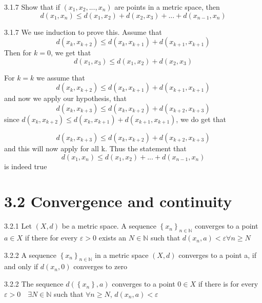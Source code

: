\documentclass[a4paper,norsk]{article}
\renewcommand{\geq}{\geqslant}
\renewcommand{\leq}{\leqslant}
\renewcommand{\epsilon}{\varepsilon}
\begin{document}
\begin{oppgavebox}{3.1.7}{}
Show that if $ \left( x_1, x_2, ..., x_n \right)  $ are points in a metric space, then 
\[
    d(x_1, x_n) \leq d(x_1, x_2) + d(x_2, x_3) + ... + d(x_{n-1} , x_n)
\]

\begin{proofbox}{3.1.7}{}
  We use induction to prove this. Assume that 
  \[
      d(x_k, x_{k+2}) \leq d(x_k, x_{k+1}) + d(x_{k+1}, x_{k+1})
  \]
  Then for $ k=0 $, we get that 
  \[
      d(x_1, x_3) \leq d(x_1, x_2) + d(x_2, x_3)
  \]
  
  For $ k=k $ we assume that 
  \[
      d(x_k, x_{k+2}) \leq d(x_k, x_{k+1}) + d(x_{k+1}, x_{k+1})
  \]
  and now we apply our hypothesis, that 
  \[
      d(x_k, x_{k+3}) \leq d(x_k, x_{k+2}) + d(x_{k+2}, x_{k+3})
  \]
  since $ d(x_k, x_{k+2}) \leq d(x_k, x_{k+1}) + d(x_{k+1}, x_{k+1}) $, we do get that 
  
  \[
      d(x_k, x_{k+3}) \leq d(x_k, x_{k+2}) + d(x_{k+2}, x_{k+3})
  \]
  and this will now apply for all k. Thus the statement that 
  \[
      d(x_1, x_n) \leq d(x_1, x_2) + ... + d(x_{n-1}, x_n)
  \]
  is indeed true  
\end{proofbox}
\end{oppgavebox}


\section*{3.2 Convergence and continuity}

\begin{definitionbox}{3.2.1}{}
Let $ \left( X, d \right)  $ be a metric space. A sequence $ \left\{ x_n \right\} _{ n \in \mathbb{N} } $ converges to a point $ a \in X $ if there for every $ \epsilon > 0 $ exists an $ N \in \mathbb{N} $ such that $ d(x_n, a) < \epsilon \forall n \geq N $ 
\end{definitionbox}

\begin{lemmabox}{3.2.2}{}
A sequence $ \left\{ x_n \right\} _{n \in \mathbb{N} } $ in a metric space $ \left( X, d \right)  $ converges to a point a, if and only if $ d(x_n, 0)  $ converges to zero

\begin{proofbox}{3.2.2}{}
  The sequence $ d( \left\{ x_n \right\} , a) $ converges to a point $ 0 \in X $ if there is for every $ \epsilon > 0 \quad \exists N \in  \mathbb{N} $ such that $ \forall n \geq N $, $ d(x_n, a) < \epsilon  $  
\end{proofbox}
\end{lemmabox}
\end{document}
